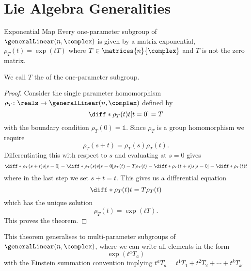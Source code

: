 \documentclass[fleqn]{NotesClass}
\newcommand*{\ident}{\mathbb{1}}
\begin{document}
    \section{Lie Algebra Generalities}\label{sec:lie algebra generalities}
    \begin{thm}{Exponential Map}{}
        Every one-parameter subgroup of \(\generalLinear(n, \complex)\) is given by a matrix exponential, \(\rho_T(t) = \exp(tT)\) where \(T \in \matrices{n}{\complex}\) and \(T\) is not the zero matrix.
        \begin{rmk}
            We call \(T\) the  of the one-parameter subgroup.
        \end{rmk}
        \begin{proof}
            Consider the single parameter homomorphism \(\rho_T \colon \reals \to \generalLinear(n, \complex)\) defined by
            \begin{equation}
                \diff*{\rho_T(t)}{t}[t = 0] = T
            \end{equation}
            with the boundary condition \(\rho_T(0) = \ident\).
            Since \(\rho_T\) is a group homomorphism we require
            \begin{equation}
                \rho_T(s + t) = \rho_T(s)\rho_T(t).
            \end{equation}
            Differentiating this with respect to \(s\) and evaluating at \(s = 0\) gives
            \begin{equation}
                \diff*{\rho_T(s + t)}{s}[s = 0] = \diff*{\rho_T(s)}{s}[s = 0]\rho_T(t) = T\rho_T(t) = \diff*{\rho_T(t + s)}{s}[s = 0] = \diff*{\rho_T(t)}{t}
            \end{equation}
            where in the last step we set \(s + t = t\).
            This gives us a differential equation
            \begin{equation}
                \diff*{\rho_T(t)}{t} = T\rho_T(t)
            \end{equation}
            which has the unique solution
            \begin{equation}
                \rho_T(t) = \exp(t T).
            \end{equation}
            This proves the theorem.
        \end{proof}
    \end{thm}
    
    This theorem generalises to multi-parameter subgroups of \(\generalLinear(n, \complex)\), where we can write all elements in the form
    \begin{equation}
        \exp(t^aT_a)
    \end{equation}
    with the Einstein summation convention implying \(t^aT_a = t^1T_1 + t^2T_2 + \dotsb + t^kT_k\).
    
\end{document}
